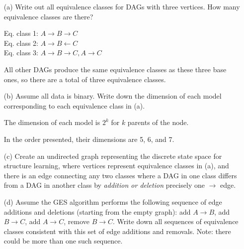 \documentclass[11pt]{article}
\begin{document}
\begin{enumerate}
\item[(a)] Write out all equivalence classes for DAGs with three vertices.  How many equivalence classes are there?

\begin{answertext}{3cm}{}

Eq. class 1: $A \to B \to C$\\
Eq. class 2: $A \to B \leftarrow C$\\
Eq. class 3: $A \to B \to C, A \to C$

All other DAGs produce the same equivalence classes as these three base ones, so there are a total of three equivalence classes.
    
\end{answertext}
\item[(b)] Assume all data is binary.  Write down the dimension of each model corresponding to each equivalence class in (a).

\begin{answertext}{3cm}{}

The dimension of each model is $2^k$ for $k$ parents of the node.

In the order presented, their dimensions are 5, 6, and 7.
    
\end{answertext}
\item[(c)] Create an undirected graph representing the discrete state space for structure learning, where vertices represent equivalence classes in (a), and there is an edge connecting any two classes where a DAG in one class differs from a DAG in another class by \emph{addition or deletion} precisely one $\to$ edge.

\begin{answertext}{1.5cm}{}
\end{answertext}

\item[(d)] 
Assume the GES algorithm performs the following sequence of edge additions and deletions (starting from the empty graph): add $A\to B$, add $B \to C$, add $A \to C$, remove $B \to C$.
Write down all sequences of equivalence classes consistent with this set of edge additions and removals.  Note: there could be more than one such sequence.


\end{enumerate}
\end{document}
